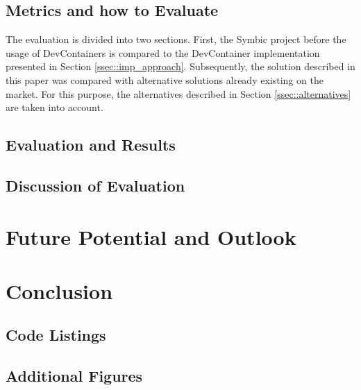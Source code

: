 \documentclass[12pt, a4paper]{article}
\begin{document}
\subsection{Metrics and how to Evaluate}
The evaluation is divided into two sections. First, the Symbic project before the usage of DevContainers is compared to the DevContainer implementation presented in Section \ref{ssec::imp_approach}. Subsequently, the solution described in this paper was compared with alternative solutions already existing on the market. For this purpose, the alternatives described in Section \ref{ssec::alternatives} are taken into account.\newline




\subsection{Evaluation and Results}\label{sses::eval_compare}
\subsection{Discussion of Evaluation}

\section{Future Potential and Outlook}\label{sec::outlook}
\section{Conclusion}\label{sec::conclusion}


\newpage

\singlespacing{}
\renewcommand{\thesubsection}{\Alph{subsection}}
\setcounter{page}{\value{lastroman}}
\vspace*{\fill}
\vspace*{\fill}



\subsection{Code Listings}


\newpage

\subsection{Additional Figures}

\newpage

\listoffigures
\listoftables
\lstlistoflistings{}
\newpage

% 




% 
\end{document}
